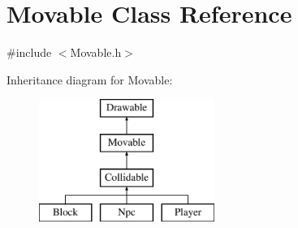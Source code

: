\hypertarget{class_movable}{\section{Movable Class Reference}
\label{class_movable}
}


{\ttfamily \#include $<$Movable.\-h$>$}

Inheritance diagram for Movable\-:\begin{figure}[H]
\begin{center}
\leavevmode
\includegraphics[height=4.000000cm]{class_movable}
\end{center}
\end{figure}
